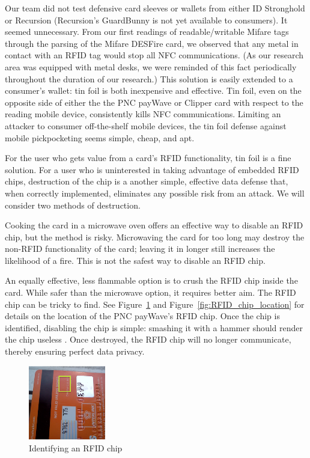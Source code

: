 \documentclass{sig-alternate}
\begin{document}
Our team did not test defensive card sleeves or wallets from either ID Stronghold or Recursion (Recursion's GuardBunny is not yet available to consumers).  It seemed unnecessary.  From our first readings of readable/writable Mifare tags through the parsing of the Mifare DESFire card, we observed that any metal in contact with an RFID tag would stop all NFC communications.  (As our research area was equipped with metal desks, we were reminded of this fact periodically throughout the duration of our research.)  This solution is easily extended to a consumer's wallet: tin foil is both inexpensive and effective.  Tin foil, even on the opposite side of either the the PNC payWave or Clipper card with respect to the reading mobile device, consistently kills NFC communications.  Limiting an attacker to consumer off-the-shelf mobile devices, the tin foil defense against mobile pickpocketing seems simple, cheap, and apt.

For the user who gets value from a card's RFID functionality, tin foil is a fine solution.  For a user who is uninterested in taking advantage of embedded RFID chips, destruction of the chip is a another simple, effective data defense that, when correctly implemented, eliminates any possible risk from an attack.  We will consider two methods of destruction.

Cooking the card in a microwave oven offers an effective way to disable an RFID chip, but the method is risky.  Microwaving the card for too long may destroy the non-RFID functionality of the card; leaving it in longer still increases the likelihood of a fire.  This is not the safest way to disable an RFID chip.

An equally effective, less flammable option is to crush the RFID chip inside the card.  While safer than the microwave option, it requires better aim.  The RFID chip can be tricky to find.  See Figure~\ref{fig:RFID_in_PNC_Card} and Figure~\ref{fig:RFID_chip_location} for details on the location of the PNC payWave's RFID chip.  Once the chip is identified, disabling the chip is simple: smashing it with a hammer should render the chip useless \cite{threat-analysis-of-rfid-passports}.  Once destroyed, the RFID chip will no longer communicate, thereby ensuring perfect data privacy.

	\begin{figure}%
	  \centering
	  \includegraphics[width=0.3\textwidth]{images/RFID_in_PNC_Card.png}
	  \caption{Identifying an RFID chip}
	  \label{fig:RFID_in_PNC_Card}
	\end{figure}
\end{document}
